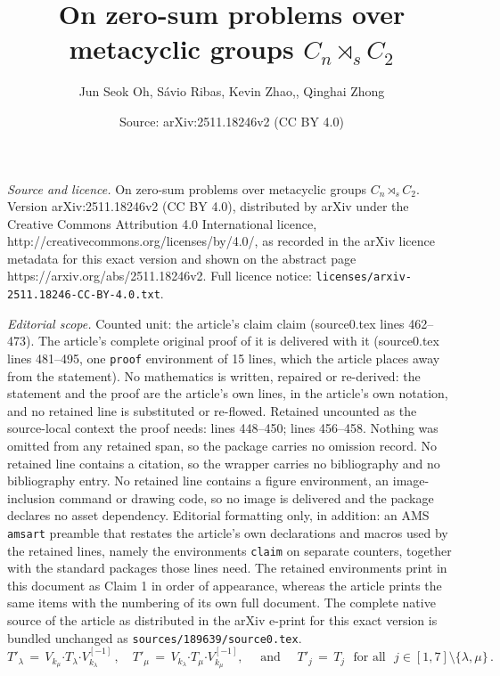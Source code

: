 \documentclass[10pt,a4paper]{amsart}
\title{On zero-sum problems over metacyclic groups $C_n \rtimes_s C_2$}
\author{Jun Seok Oh, S\'avio Ribas, Kevin Zhao,, Qinghai Zhong}
\date{Source: arXiv:2511.18246v2 (CC BY 4.0)}
\def\bd{{\boldsymbol{\cdot}}}
\begin{document}
\maketitle

\noindent\emph{Source and licence.} On zero-sum problems over metacyclic groups $C_n \rtimes_s C_2$. Version arXiv:2511.18246v2 (CC BY 4.0), distributed by arXiv under the Creative Commons Attribution 4.0 International licence, http://creativecommons.org/licenses/by/4.0/, as recorded in the arXiv licence metadata for this exact version and shown on the abstract page https://arxiv.org/abs/2511.18246v2. Full licence notice: \texttt{licenses/arxiv-2511.18246-CC-BY-4.0.txt}.\par\smallskip

\noindent\textit{Editorial scope.} Counted unit: the article's claim claim (source0.tex lines 462--473). The article's complete original proof of it is delivered with it (source0.tex lines 481--495, one \texttt{proof} environment of 15 lines, which the article places away from the statement). No mathematics is written, repaired or re-derived: the statement and the proof are the article's own lines, in the article's own notation, and no retained line is substituted or re-flowed.  Retained uncounted as the source-local context the proof needs: lines 448--450; lines 456--458.  Nothing was omitted from any retained span, so the package carries no omission record.  No retained line contains a citation, so the wrapper carries no bibliography and no bibliography entry.  No retained line contains a figure environment, an image-inclusion command or drawing code, so no image is delivered and the package declares no asset dependency.  Editorial formatting only, in addition: an AMS \texttt{amsart} preamble that restates the article's own declarations and macros used by the retained lines, namely the environments \texttt{claim} on separate counters, together with the standard packages those lines need.  The retained environments print in this document as Claim 1 in order of appearance, whereas the article prints the same items with the numbering of its own full document.  The complete native source of the article as distributed in the arXiv e-print for this exact version is bundled unchanged as \texttt{sources/189639/source0.tex}.
		\begin{equation}\label{new-decomposition}
		T'_{\lambda} \, = \, V_{k_{\mu}} \bd T_{\lambda} \bd V_{k_{\lambda}}^{[-1]} \,, \quad T'_{\mu} \, = \, V_{k_{\lambda}} \bd T_{\mu} \bd V_{k_{\mu}}^{[-1]}, \quad \mbox{ and } \quad T'_j \, = \, T_j \,\, \mbox{ for all } \,\, j \in [1,7] \setminus \{ \lambda, \mu \} \,.
		\end{equation}
\end{document}

